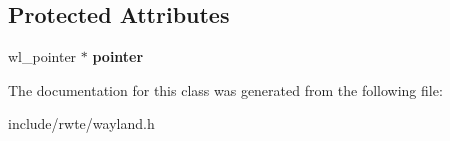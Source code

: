 \subsection*{Protected Attributes}
\begin{DoxyCompactItemize}
\item 
\mbox{\label{classwayland_1_1Pointer_a20d0a5894d1b2ba17686d15d5d55d5ad}} 
wl\+\_\+pointer $\ast$ {\bfseries pointer}
\end{DoxyCompactItemize}


The documentation for this class was generated from the following file\+:\begin{DoxyCompactItemize}
\item 
include/rwte/wayland.\+h\end{DoxyCompactItemize}
